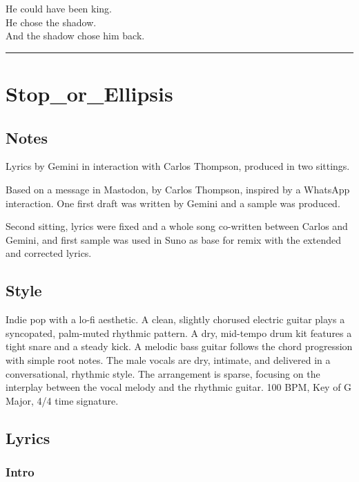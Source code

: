 He could have been king.\\
He chose the shadow.\\
And the shadow chose him back.

\begin{center}\rule{0.5\linewidth}{0.5pt}\end{center}

\section{Stop\_or\_Ellipsis}\label{stop_or_ellipsis}

\subsection{Notes}\label{notes-12}

Lyrics by Gemini in interaction with Carlos Thompson, produced in two
sittings.

Based on a message in Mastodon, by Carlos Thompson, inspired by a
WhatsApp interaction. One first draft was written by Gemini and a sample
was produced.

Second sitting, lyrics were fixed and a whole song co-written between
Carlos and Gemini, and first sample was used in Suno as base for remix
with the extended and corrected lyrics.

\subsection{Style}\label{style-12}

Indie pop with a lo-fi aesthetic. A clean, slightly chorused electric
guitar plays a syncopated, palm-muted rhythmic pattern. A dry, mid-tempo
drum kit features a tight snare and a steady kick. A melodic bass guitar
follows the chord progression with simple root notes. The male vocals
are dry, intimate, and delivered in a conversational, rhythmic style.
The arrangement is sparse, focusing on the interplay between the vocal
melody and the rhythmic guitar. 100 BPM, Key of G Major, 4/4 time
signature.

\subsection{Lyrics}\label{lyrics-12}

\subsubsection{Intro}\label{intro}

